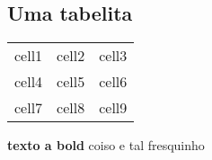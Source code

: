 \subsection{Uma tabelita}\label{subsec:uma-tabelita}

\begin{center}
\begin{tabular}{ c c c }
 cell1 & cell2 & cell3 \\
 cell4 & cell5 & cell6 \\
 cell7 & cell8 & cell9
\end{tabular}
\end{center}

\textbf{texto a bold} coiso e tal fresquinho

